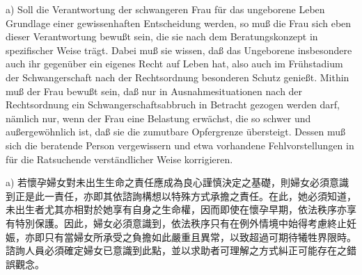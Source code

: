 \documentclass[12pt]{article}
\begin{document}
\begin{sourcepara}[title={原文D.113}]
a) Soll die Verantwortung der schwangeren Frau für das ungeborene Leben Grundlage einer gewissenhaften Entscheidung werden, so muß die Frau sich eben dieser Verantwortung bewußt sein, die sie nach dem Beratungskonzept in spezifischer Weise trägt. Dabei muß sie wissen, daß das Ungeborene insbesondere auch ihr gegenüber ein eigenes Recht auf Leben hat, also auch im Frühstadium der Schwangerschaft nach der Rechtsordnung besonderen Schutz genießt. Mithin muß der Frau bewußt sein, daß nur in Ausnahmesituationen nach der Rechtsordnung ein Schwangerschaftsabbruch in Betracht gezogen werden darf, nämlich nur, wenn der Frau eine Belastung erwächst, die so schwer und außergewöhnlich ist, daß sie die zumutbare Opfergrenze übersteigt. Dessen muß sich die beratende Person vergewissern und etwa vorhandene Fehlvorstellungen in für die Ratsuchende verständlicher Weise korrigieren.
\end{sourcepara}
\begin{transpara}
a) 若懷孕婦女對未出生生命之責任應成為良心謹慎決定之基礎，則婦女必須意識到正是此一責任，亦即其依諮詢構想以特殊方式承擔之責任。在此，她必須知道，未出生者尤其亦相對於她享有自身之生命權，因而即使在懷孕早期，依法秩序亦享有特別保護。因此，婦女必須意識到，依法秩序只有在例外情境中始得考慮終止妊娠，亦即只有當婦女所承受之負擔如此嚴重且異常，以致超過可期待犧牲界限時。諮詢人員必須確定婦女已意識到此點，並以求助者可理解之方式糾正可能存在之錯誤觀念。
\end{transpara}
\end{document}

